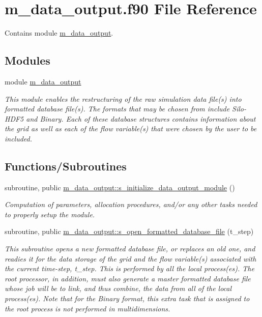\hypertarget{m__data__output_8f90}{}\section{m\+\_\+data\+\_\+output.\+f90 File Reference}
\label{m__data__output_8f90}


Contains module \hyperlink{namespacem__data__output}{m\+\_\+data\+\_\+output}.  


\subsection*{Modules}
\begin{DoxyCompactItemize}
\item 
module \hyperlink{namespacem__data__output}{m\+\_\+data\+\_\+output}
\begin{DoxyCompactList}\small\item\em This module enables the restructuring of the raw simulation data file(s) into formatted database file(s). The formats that may be chosen from include Silo-\/\+H\+D\+F5 and Binary. Each of these database structures contains information about the grid as well as each of the flow variable(s) that were chosen by the user to be included. \end{DoxyCompactList}\end{DoxyCompactItemize}
\subsection*{Functions/\+Subroutines}
\begin{DoxyCompactItemize}
\item 
subroutine, public \hyperlink{namespacem__data__output_ab65b312ef83adb104cafafada9c998b6}{m\+\_\+data\+\_\+output\+::s\+\_\+initialize\+\_\+data\+\_\+output\+\_\+module} ()
\begin{DoxyCompactList}\small\item\em Computation of parameters, allocation procedures, and/or any other tasks needed to properly setup the module. \end{DoxyCompactList}\item 
subroutine, public \hyperlink{namespacem__data__output_ae767b4364e76ee05872868171fd2f05d}{m\+\_\+data\+\_\+output\+::s\+\_\+open\+\_\+formatted\+\_\+database\+\_\+file} (t\+\_\+step)
\begin{DoxyCompactList}\small\item\em This subroutine opens a new formatted database file, or replaces an old one, and readies it for the data storage of the grid and the flow variable(s) associated with the current time-\/step, t\+\_\+step. This is performed by all the local process(es). The root processor, in addition, must also generate a master formatted database file whose job will be to link, and thus combine, the data from all of the local process(es). Note that for the Binary format, this extra task that is assigned to the root process is not performed in multidimensions. \end{DoxyCompactList}\end{DoxyCompactItemize}
